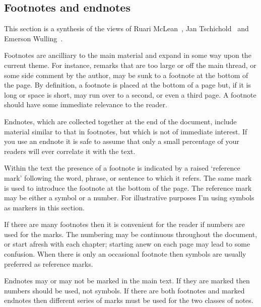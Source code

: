 \documentclass[10pt,a4paper,oneside,extrafontsizes]{memoir}%
\begin{document}
\subsection{Footnotes and endnotes}

\renewcommand*{\thefootnote}{\fnsymbol{footnote}}
\let\oldfootnoterule\footnoterule
\renewcommand*{\footnoterule}{}


\begin{paracol}{2}
\switchEng
    This section is a synthesis of the views of Ruari McLean~\autocite{MCLEAN80},
Jan Tschichold~\autocite{TSCHICHOLD91} and 
Emerson Wulling~\autocite{WULLING-FOOTNOTES}.

    Footnotes are ancilliary to the main material and 
expand in some way
upon the current theme. For instance, remarks that are too large or off the
main thread, or some side comment by the author, may be sunk to a footnote 
at the bottom of the page. By definition, a footnote is placed at the 
bottom of a page but, if it is long or space is short, may run over to a 
second, or even a third page. A footnote should have some immediate 
relevance to the reader.

Endnotes, which are collected together at the end of the 
document, include 
material similar to that in footnotes, but which is not of immediate interest.
If you use an endnote it is safe to assume that only a small 
percentage of your readers will ever correlate it with the text.
 
    Within the text the presence of a footnote is indicated by a raised 
`reference mark' following the
word, phrase, or sentence to which it refers. The same mark is used 
to introduce the footnote at the bottom of the page.
The reference mark may be either a 
symbol or a number. For illustrative purposes I'm using symbols
as markers in this section.

   If there are many footnotes then it is convenient for the reader if numbers 
are used for the marks. The numbering may be continuous 
throughout the document,
or start afresh with each chapter; starting anew on each page may lead to
some confusion. When there is only an occasional footnote then symbols 
are usually preferred as reference marks.

    Endnotes may or may not be marked in the main text. 
If they are marked then numbers
should be used, not symbols. If there are both footnotes and marked endnotes 
then different series of marks must be used for the two classes of notes.


\end{paracol}
\end{document}
